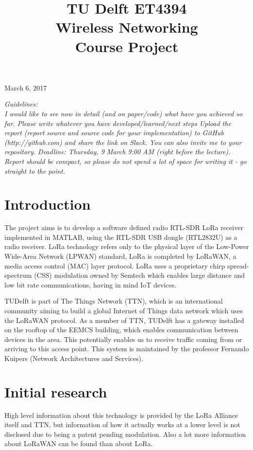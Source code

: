 \documentclass{icmmcm}
\title{TU Delft ET4394\\Wireless Networking\\Course Project}
\newcommand{\fakesection}[1]{%
  \par\refstepcounter{section}%
  \sectionmark{#1}%
  \addcontentsline{toc}{section}{\protect\numberline{\thesection}#1}%
}
\begin{document}
\maketitle
\begin{center}

\vspace{32 pt}
March 6, 2017
\end{center}



\textit{Guidelines:\\
I would like to see now in detail (and on paper/code) what have you achieved so far. Please write whatever you have developed/learned/next steps
Upload the report (report source and source code for your implementation) to GitHub (http://github.com) and share the link on Slack. You can also invite me to your repository. Deadline: Thursday, 9 March 9:00 AM (right before the lecture). Report should be compact, so please do not spend a lot of space for writing it - go straight to the point.}


\tableofcontents


\newpage
\section{Introduction}
The project aims is to develop a software defined radio RTL-SDR LoRa receiver implemented in MATLAB, using the RTL-SDR USB dongle (RTL2832U) as a radio receiver. LoRa technology refers only to the physical layer of the Low-Power Wide-Area Network (LPWAN) standard, LoRa is completed by LoRaWAN, a media access control (MAC) layer protocol. LoRa uses a proprietary chirp spread-spectrum (CSS) modulation owned by Semtech which enables large distance and low bit rate communications, having in mind IoT devices.

TUDelft is part of The Things Network (TTN), which is an international community aiming to build a global Internet of Things data network which uses the LoRaWAN protocol.
As a member of TTN, TUDelft has a gateway installed on the rooftop of the EEMCS building, which enables communication between devices in the area. This potentially enables us to receive traffic coming from or arriving to this access point. This system is maintained by the professor Fernando Kuipers (Network Architectures and Services).

\section{Initial research}
High level information about this technology is provided by the LoRa Alliance itself and TTN, but information of how it actually works at a lower level is not disclosed due to being a patent pending modulation. Also a lot more information about LoRaWAN can be found than about LoRa.
\end{document}
